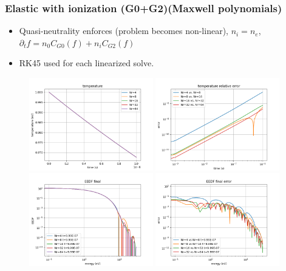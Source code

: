 \documentclass[mathserif, aspectratio=169]{beamer}
\begin{document}
	\begin{frame}
		\frametitle{Elastic with ionization (G0+G2)(Maxwell polynomials)}
		\begin{itemize}
			\item Quasi-neutrality enforces (problem becomes non-linear), $n_i=n_e$, $\partial_t f = n_0 C_{G0}(f) + n_i C_{G2}(f)$
			\item RK45 used for each linearized solve. 
		\end{itemize}
		\begin{figure}
			\only<+>
			{
				\includegraphics[width=0.48\textwidth]{g02_mw_temp.png}
				\includegraphics[width=0.48\textwidth]{g02_mw_temp_error.png}
			}
			\only<+>
			{
				\includegraphics[width=0.48\textwidth]{g02_mw_eedf_final.png}
				\includegraphics[width=0.48\textwidth]{g02_mw_eedf_final_error.png}
}
\end{figure}
\end{frame}
\end{document}
